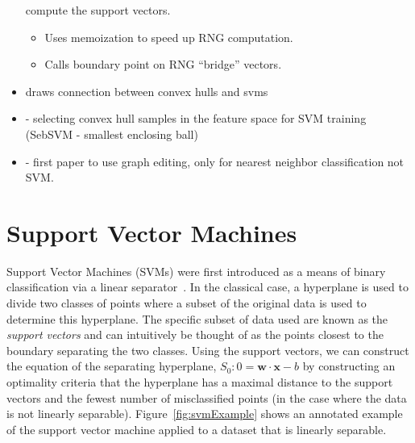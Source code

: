 \documentclass[12pt]{article}
\begin{document}
\begin{itemize}
	compute the support vectors.
	\begin{itemize}
		\item Uses memoization to speed up RNG computation.
		\item Calls boundary point on RNG ``bridge'' vectors.
	\end{itemize}
	\item \cite{BennettBredensteiner2000} draws connection between convex hulls and svms
	\item \cite{ZengXuXie2008} - selecting convex hull samples in the feature space for SVM training (SebSVM - smallest enclosing ball)
	\item \cite{BhattacharyaPoulsenToussaint1981} - first paper to use graph editing, only for nearest neighbor classification not SVM.
\end{itemize}



\section{Support Vector Machines}

Support Vector Machines (SVMs) were first introduced as a means of binary
classification via a linear separator~\cite{VapnikLerner1963}.
%
In the classical case, a hyperplane is used to divide two classes of points
where a subset of the original data is used to determine this hyperplane.
%
The specific subset of data used are known as the \emph{support vectors} and can
intuitively be thought of as the points closest to the boundary separating the
two classes.
%
Using the support vectors, we can construct the equation of the separating
hyperplane, $S_0: 0 = \mathbf{w} \cdot \mathbf{x} - b$ by constructing an
optimality criteria that the hyperplane has a maximal distance to the support
vectors and the fewest number of misclassified points (in the case where the
data is not linearly separable).
%
Figure~\ref{fig:svmExample} shows an annotated example of the support vector
machine applied to a dataset that is linearly separable.
\end{document}
